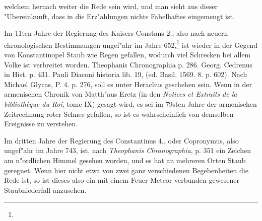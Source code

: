 \documentclass[a4paper, 11pt, oneside, polutonikogreek, german]{article}
\begin{document}
welchem hernach weiter die Rede sein wird, und man sieht aus dieser "Ubereinkunft, dass in die Erz"ahlungen nichts Fabelhaftes eingemengt ist.



Im 11ten Jahre der Regierung des Kaisers Constans 2., also nach neuern chronologischen Bestimmungen ungef"ahr im Jahre 652,\footnote{} ist wieder in der Gegend von Konstantinopel Staub wie Regen gefallen, wodurch viel Schrecken bei allem Volke ist verbreitet worden. Theophanis Chronographia p. 286. Georg. Cedrenus in Hist. p. 431. Pauli Diaconi historia lib. 19, (ed. Basil. 1569. 8. p. 602). Nach Michael Glycas, P. 4. p. 276, soll es unter Heraclius geschehen sein. Wenn in der armenischen Chronik von Matth"aus Eretz (in den \emph{Notices et Extraits de la bibliothèque du Roi}, tome IX) gesagt wird, es sei im 79sten Jahre der armenischen Zeitrechnung roter Schnee gefallen, so ist es wahrscheinlich von demselben Ereignisse zu verstehen.

Im dritten Jahre der Regierung des Constantinus 4., oder Copronymus, also ungef"ahr im Jahre 743, ist, nach \emph{Theophanis Chronographia}, p. 351 ein Zeichen am n"ordlichen Himmel gesehen worden, und es hat an mehreren Orten Staub geregnet. Wenn hier nicht etwa von zwei ganz verschiedenen Begebenheiten die Rede ist, so ist dieses also ein mit einem Feuer-Meteor verbunden gewesener Staubniederfall anzusehen.
\end{document}

